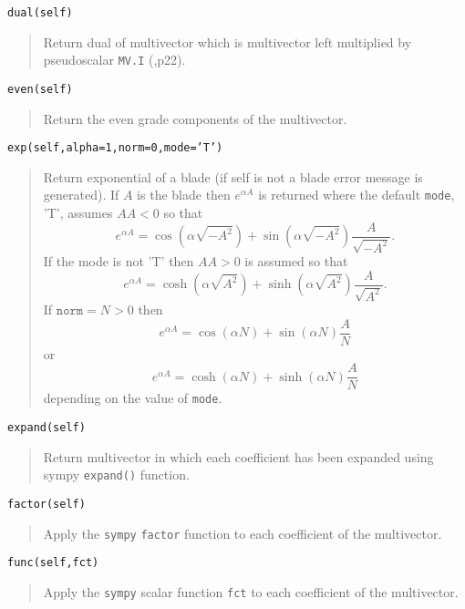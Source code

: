 \documentclass[10pt]{article}
\newcommand{\bfrac}[2]{\displaystyle\frac{#1}{#2}}
\newcommand{\lp}{\left (}
\newcommand{\rp}{\right )}
\newcommand{\f}[2]{{#1}\lp {#2} \rp}
\newcommand{\T}[1]{\texttt{#1}}
\begin{document}
\T{dual(self)}
\begin{quote}
   Return dual of multivector which is multivector left multiplied by
   pseudoscalar \T{MV.I} (\cite{Hestenes},p22).
\end{quote}

\T{even(self)}
\begin{quote}
   Return the even grade components of the multivector.
\end{quote}

\T{exp(self,alpha=1,norm=0,mode='T')}
\begin{quote}
    Return exponential of a blade (if self is not a blade error message 
    is generated).  If $A$ is the blade then $e^{\alpha A}$ is returned
    where the default \T{mode}, 'T', assumes $AA < 0$ so that 
    \begin{equation*}
    		e^{\alpha A} = \f{\cos}{\alpha\sqrt{-A^{2}}}+\f{\sin}{\alpha\sqrt{-A^{2}}}\bfrac{A}{\sqrt{-A^{2}}}.
    \end{equation*}
    If the mode is not 'T' then $AA > 0$ is assumed so that
    \begin{equation*}
    		e^{\alpha A} = \f{\cosh}{\alpha\sqrt{A^{2}}}+\f{\sinh}{\alpha\sqrt{A^{2}}}\bfrac{A}{\sqrt{A^{2}}}.
    \end{equation*}
    If $\T{norm} = N > 0$ then
    \begin{equation*}
    		e^{\alpha A} = \f{\cos}{\alpha N}+\f{\sin}{\alpha N}\bfrac{A}{N}
    \end{equation*}
    or
    \begin{equation*}
    		e^{\alpha A} = \f{\cosh}{\alpha N}+\f{\sinh}{\alpha N}\bfrac{A}{N}
    \end{equation*}
    depending on the value of \T{mode}.
\end{quote}

\T{expand(self)}
\begin{quote}
   Return multivector in which each coefficient has been expanded using
   sympy \T{expand()} function.
\end{quote}

\T{factor(self)}
\begin{quote}
   Apply the \T{sympy} \T{factor} function to each coefficient of the multivector.
\end{quote}

\T{func(self,fct)}
\begin{quote}
   Apply the \T{sympy} scalar function \T{fct} to each coefficient of the multivector.
\end{quote}
\end{document}
